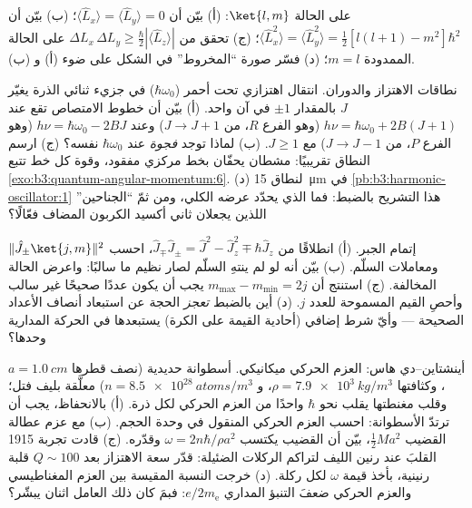 \begin{exercise}[$\star\star$]\label{exo:b3:quantum-angular-momentum:9}
على الحالة $\ket{l, m}$: (أ) بيّن أن $\langle\hat L_x\rangle = \langle\hat
L_y\rangle = 0$؛ (ب) بيّن أن $\langle\hat L_x^2\rangle = \langle\hat
L_y^2\rangle = \tfrac12[l(l+1) - m^2]\hbar^2$؛ (ج) تحقق من
 $\Delta L_x\,\Delta L_y \ge \tfrac\hbar2
|\langle\hat L_z\rangle|$ على الحالة الممدودة $m = l$؛ (د)
فسّر صورة ``المخروط'' في الشكل على ضوء (أ) و
(ب).
\end{exercise}

\begin{exercise}[$\star\star\star$]\label{exo:b3:quantum-angular-momentum:10}
نطاقات الاهتزاز والدوران. انتقال اهتزازي تحت أحمر
($\hbar\omega_0$) في جزيء ثنائي الذرة يغيّر $J$ بالمقدار $\pm1$
في آن واحد. (أ) بيّن أن خطوط الامتصاص تقع عند $h\nu =
\hbar\omega_0 + 2B(J+1)$ (وهو الفرع $R$، من $J \to J+1$) وعند
$h\nu = \hbar\omega_0 - 2BJ$ (وهو الفرع $P$، من $J \to J-1$) مع $J \ge
1$. (ب) لماذا توجد \emph{فجوة} عند $\hbar\omega_0$ نفسه؟ (ج)
ارسم النطاق تقريبيًا: مشطان يحفّان بخط مركزي مفقود، وقوة كل
خط تتبع
\cref{exo:b3:quantum-angular-momentum:6}. (د) لنطاق
\qty{15}{\micro m} في \cref{pb:b3:harmonic-oscillator:1} هذا
التشريح بالضبط: فما الذي يحدّد عرضه الكلي، ومن ثمّ
``الجناحين'' اللذين يجعلان ثاني أكسيد الكربون المضاف فعّالًا؟
\end{exercise}

\begin{exercise}[$\star\star\star$]\label{exo:b3:quantum-angular-momentum:11}
إتمام الجبر. (أ) انطلاقًا من $\hat J_\mp\hat J_\pm = \hat J^2 -
\hat J_z^2 \mp \hbar\hat J_z$، احسب $\|\hat J_\pm\ket{j,m}\|^2$
ومعاملات السلّم. (ب) بيّن أنه لو لم ينتهِ السلّم
لصار نظيم ما سالبًا: واعرض الحالة المخالفة.
(ج) استنتج أن $m_{\max} - m_{\min} = 2j$ يجب أن يكون عددًا صحيحًا
غير سالب وأحصِ القيم المسموحة للعدد $j$. (د) أين بالضبط \emph{تعجز}
الحجة عن استبعاد أنصاف الأعداد الصحيحة --- وأيّ
شرط إضافي (أحادية القيمة على الكرة) يستبعدها
في الحركة المدارية وحدها؟
\end{exercise}

\begin{exercise}[$\star\star\star$]\label{exo:b3:quantum-angular-momentum:12}
أينشتاين--دي هاس: العزم الحركي ميكانيكي. أسطوانة حديدية
(نصف قطرها $a = \qty{1.0}{cm}$، وكثافتها $\rho = \qty{7.9e3}{kg/m^3}$، و
$n = \qty{8.5e28}{atoms/m^3}$) معلَّقة بليف فتل؛ وقلب
مغنطتها يقلب نحو $\hbar$ واحدًا من العزم الحركي لكل
ذرة. (أ) بالانحفاظ، يجب أن ترتدّ الأسطوانة: احسب العزم
الحركي المنقول في وحدة الحجم. (ب) مع عزم عطالة القضيب $\tfrac12 M
a^2$، بيّن أن القضيب يكتسب $\omega = 2n\hbar/\rho a^2$ وقدّره.
(ج) قادت تجربة 1915 القلبَ عند رنين الليف لتراكم
الركلات الضئيلة: قدّر سعة الاهتزاز
بعد $Q \sim 100$ قلبة رنينية، بأخذ قيمة
$\omega$ لكل ركلة. (د) خرجت النسبة المقيسة بين العزم المغناطيسي والعزم الحركي
ضعفَ التنبؤ المداري $e/2m_{\text{e}}$: فبمَ كان
ذلك العامل اثنان يبشّر؟
\end{exercise}

